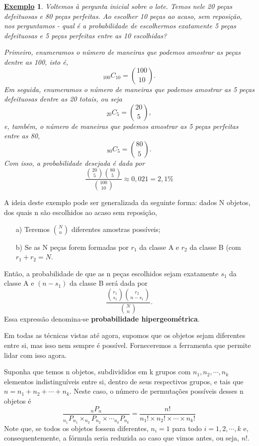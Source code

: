 \documentclass{article}
\newtheorem{example}{\underline{Exemplo}}
\begin{document}
\begin{example}
  Voltemos à pergunta inicial sobre o lote. Temos nele 20 peças defeituosas e 80 peças perfeitas. Ao escolher
10 peças ao acaso, sem reposição, nos perguntamos - qual é a probabilidade de escolhermos exatamente 5 peças defeituosas
e 5 peças perfeitas entre as 10 escolhidas?

  Primeiro, enumeramos o número de maneiras que podemos amostrar as peças dentre as 100, isto é, 
  \[
    _{100}C_{10} = \binom{100}{10}.
  \]
  Em seguida, enumeramos o número de maneiras que podemos amostrar as 5 peças defeituosas dentre as 20 totais, ou seja 
  \[
    _{20}C_{5} = \binom{20}{5},
  \]
e, também, o número de maneiras que podemos amostrar as 5 peças perfeitas entre as 80,
  \[
    _{80}C_{5} = \binom{80}{5}.
  \]
  Com isso, a probabilidade desejada é dada por 
  \[
    \frac{\binom{20}{5}\binom{80}{5}}{\binom{100}{10}} \approx 0,021 = 2,1\%
  \]
\end{example}
  A ideia deste exemplo pode ser generalizada da seguinte forma: dados N objetos, dos quais
n são escolhidos ao acaso sem reposição, 
\begin{itemize}
  \item[a)] Teremos \(\binom{N}{n}\) diferentes amostras possíveis;
  \item[b)] Se as N peças forem formadas por \(r_{1}\) da classe A e \(r_{2}\) da classe B (com \(r_{1} + r_{2} = N\).
\end{itemize}
  Então, a probabilidade de que as n peças escolhidos sejam exatamente \(s_{1}\) da classe A
e \((n-s_{1})\) da classe B será dada por 
  \[
  \frac{\binom{r_{1}}{s_{1}}\binom{r_{2}}{n-s_{1}}}{\binom{N}{n}}.
  \]
  Essa expressão denomina-se \textbf{probabilidade hipergeométrica}.

  Em todas as técnicas vistas até agora, supomos que os objetos sejam diferentes entre si, mas isso nem sempre é possível.
Forneceremos a ferramenta que permite lidar com isso agora. 

Suponha que temos n objetos, subdivididos em k grupos com
 \(n_{1}, n_{2}, \cdots, n_{k}\) elementos indistinguíveis entre si, dentro de seus respectivos grupos, 
 e tais que \(n = n_{1} + n_{2} + \cdots + n_{k}\). Neste caso, o número de permutações possíveis desses n objetos é 
 \[
   \frac{_{n}P_{n}}{_{n_{1}}P_{n_{1}}\times _{n_{2}}P_{n_{2}}\times \cdots _{n_{k}}P_{n_{k}}} = \frac{n!}{n_{1}!\times n_{2}!\times \cdots\times n_{k}!}
 \]
 Note que, se todos os objetos fossem diferentes, \(n_{i} = 1\) para todo \(i=1, 2, \cdots, k\) e, consequentemente,
a fórmula seria reduzida ao caso que vimos antes, ou seja, \(n!.\)
\end{document}
